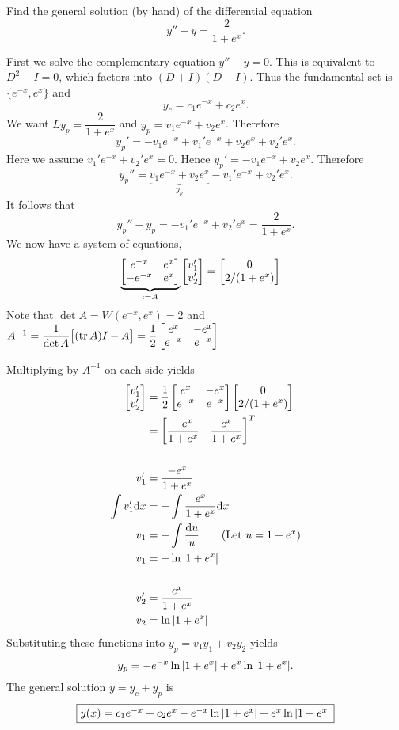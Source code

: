 Find the general solution (by hand) of the differential equation 
$$y'' - y = \frac{2}{1+e^x}.$$

\soln First we solve the complementary equation $y'' - y = 0$. This is equivalent to $D^2 - I = 0$, which factors into $(D+I)(D-I)$. Thus the fundamental set is $\{e^{-x}, e^{x}\}$ and $$y_c = c_1 e^{-x} + c_2 e^x.$$
We want $Ly_p = \dfrac{2}{1+e^x}$ and $y_p = v_1 e^{-x} + v_2 e^{x}$. Therefore 
$${y_p}' = -v_1 e^{-x} + v_1'e^{-x} + v_2 e^x + v_2'e^x.$$
Here we assume $v_1'e^{-x} + v_2'e^x = 0$. Hence ${y_p}' = -v_1 e^{-x}  + v_2 e^x$. Therefore
$${y_p}'' = \underbrace{v_1 e^{-x} + v_2 e^x}_{y_p} - v_1' e^{-x} + v_2'e^x.$$
It follows that 
$${y_p}'' - y_p = - v_1' e^{-x} + v_2'e^x = \frac{2}{1+e^x}.$$
We now have a system of equations,
\begin{align*}
    \underbrace{\begin{bmatrix}
        e^{-x} & e^x \\ -e^{-x} & e^x
    \end{bmatrix}}_{:= A} \vvec*{v_1'}{v_2'}  &= \vvec*{0}{2/(1+e^x)}
\end{align*}
Note that $\det A =  W(e^{-x}, e^x) = 2$ and $A^{-1} = \dfrac{1}{\det A} \big[ { (\operatorname{tr}A)I - A} \big] = \dfrac{1}{2} \displaystyle \begin{bmatrix}
    e^x & -e^x \\ e^{-x} & e^{-x}
\end{bmatrix}$

\nl Multiplying by $A^{-1}$ on each side yields
\begin{align*}
    \vvec*{v_1'}{v_2'} &= \dfrac{1}{2} \displaystyle \begin{bmatrix}
        e^x & -e^x \\ e^{-x} & e^{-x}
    \end{bmatrix}  \vvec*{0}{2/(1+e^x)}\\
    &= \begin{bmatrix}
        \dfrac{-e^x}{1+e^x} & \dfrac{e^x}{1+e^x}
    \end{bmatrix}^T
    \\ & \\
    v_1' &= \dfrac{-e^x}{1+e^x} \\
    \int v_1' \dd x &= - \int \dfrac{e^x}{1+e^x} \dd x\\
    v_1 &= - \int \frac{\dd u}{u} \tag{Let $u = 1+e^x$}\\
    v_1 &= -\ln \abs{1+e^x} \\ & \\
    v_2' &= \dfrac{e^x}{1+e^x} \\
    v_2 &= \ln \abs{1+e^x}
\end{align*}
Substituting these functions into $y_p = v_1 y_1 + v_2 y_2$ yields
$$y_p = -e^{-x} \ln \abs{1+e^x} + e^x \ln \abs{1+e^x}.$$
The general solution $y = y_c + y_p$ is 
$$\boxed{$$y(x) = c_1 e^{-x} + c_2 e^{x} - e^{-x} \ln \abs{1+e^x} + e^x \ln \abs{1+e^x}$$}$$


